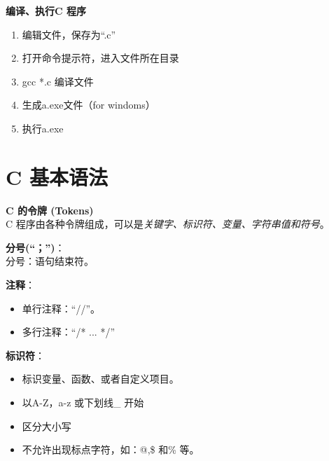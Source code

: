 \documentclass[UTF8]{ctexart}
\begin{document}
	\textbf{编译、执行C 程序}
	\begin{enumerate}
		\item 编辑文件，保存为“.c”
		\item 打开命令提示符，进入文件所在目录
		\item gcc *.c 编译文件
		\item 生成a.exe文件（for  windoms）
		\item 执行a.exe
	\end{enumerate}

	\clearpage
	\section{C 基本语法}
	\textbf{C 的令牌 (Tokens)}\\C 程序由各种令牌组成，可以是\emph{关键字、标识符、变量、字符串值和符号}。
	
	\textbf{分号(“；”)}：\\分号：语句结束符。
	
	\textbf{注释}：\begin{itemize}
		\item 单行注释：“//”。
		\item 多行注释：“/* ... */”
	\end{itemize}
	
	\textbf{标识符}：\begin{itemize}
		\item 标识变量、函数、或者自定义项目。
		\item 以A-Z，a-z 或下划线\_ 开始
		\item 区分大小写
		\item 不允许出现标点字符，如：@,\$ 和\% 等。
	\end{itemize}
\end{document}

